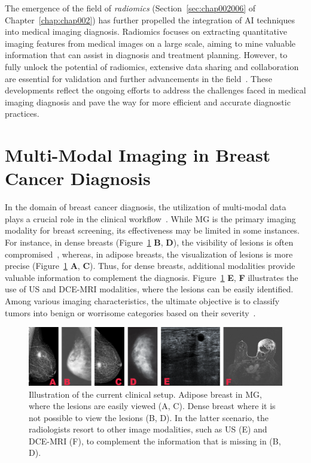 The emergence of the field of {\it radiomics} (Section~\ref{sec:chap002006} of Chapter~\ref{chap:chap002}) has further propelled the integration of \ac{AI} techniques into medical imaging diagnosis.
Radiomics focuses on extracting quantitative imaging features from medical images on a large scale, aiming to mine valuable information that can assist in diagnosis and treatment planning.
However, to fully unlock the potential of radiomics, extensive data sharing and collaboration are essential for validation and further advancements in the field~\cite{Lambin2017, pesapane2018artificial, doi:10.1148/radiol.2015151169}.
These developments reflect the ongoing efforts to address the challenges faced in medical imaging diagnosis and pave the way for more efficient and accurate diagnostic practices.

\section{Multi-Modal Imaging in Breast Cancer Diagnosis}
\label{sec:app001002}

In the domain of breast cancer diagnosis, the utilization of multi-modal data plays a crucial role in the clinical workflow~\cite{10.1117/1.JBO.22.4.046008}.
While \ac{MG} is the primary imaging modality for breast screening, its effectiveness may be limited in some instances.
For instance, in dense breasts (Figure~\ref{fig:fig005} {\bf B}, {\bf D}), the visibility of lesions is often compromised~\cite{10.1093/jbi/wbaa010}, whereas, in adipose breasts, the visualization of lesions is more precise (Figure~\ref{fig:fig005} {\bf A}, {\bf C}).
Thus, for dense breasts, additional modalities provide valuable information to complement the diagnosis.
Figure~\ref{fig:fig005} {\bf E}, {\bf F} illustrates the use of \ac{US} and \ac{DCE-MRI} modalities, where the lesions can be easily identified.
Among various imaging characteristics, the ultimate objective is to classify tumors into benign or worrisome categories based on their severity~\cite{SHAN2016980}.

\begin{figure}[htbp]
\centering
\includegraphics[width=\columnwidth]{images/fig005}
\caption{Illustration of the current clinical setup. Adipose breast in MG, where the lesions are easily viewed (A, C). Dense breast where it is not possible to view the lesions (B, D). In the latter scenario, the radiologists resort to other image modalities, such as US (E) and DCE-MRI (F), to complement the information that is missing in (B, D).}
\label{fig:fig005}
\end{figure}

